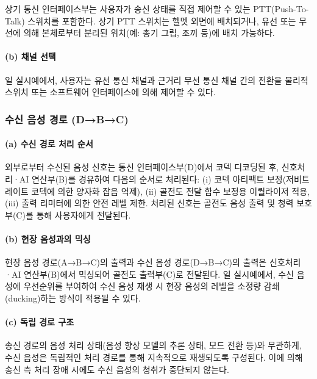 \documentclass{article}
\begin{document}
상기 통신 인터페이스부는 사용자가 송신 상태를 직접 제어할 수 있는 PTT(Push-To-Talk) 스위치를 포함한다. 상기 PTT 스위치는 헬멧 외면에 배치되거나, 유선 또는 무선에 의해 본체로부터 분리된 위치(예: 총기 그립, 조끼 등)에 배치 가능하다.

\paragraph{(b) 채널 선택}

일 실시예에서, 사용자는 유선 통신 채널과 근거리 무선 통신 채널 간의 전환을 물리적 스위치 또는 소프트웨어 인터페이스에 의해 제어할 수 있다.

\subsubsection{수신 음성 경로 (D→B→C)}

\paragraph{(a) 수신 경로 처리 순서}

외부로부터 수신된 음성 신호는 통신 인터페이스부(D)에서 코덱 디코딩된 후, 신호처리·AI 연산부(B)를 경유하여 다음의 순서로 처리된다: (i) 코덱 아티팩트 보정(저비트레이트 코덱에 의한 양자화 잡음 억제), (ii) 골전도 전달 함수 보정용 이퀄라이저 적용, (iii) 출력 리미터에 의한 안전 레벨 제한. 처리된 신호는 골전도 음성 출력 및 청력 보호부(C)를 통해 사용자에게 전달된다.

\paragraph{(b) 현장 음성과의 믹싱}

현장 음성 경로(A→B→C)의 출력과 수신 음성 경로(D→B→C)의 출력은 신호처리·AI 연산부(B)에서 믹싱되어 골전도 출력부(C)로 전달된다. 일 실시예에서, 수신 음성에 우선순위를 부여하여 수신 음성 재생 시 현장 음성의 레벨을 소정량 감쇄(ducking)하는 방식이 적용될 수 있다.

\paragraph{(c) 독립 경로 구조}

송신 경로의 음성 처리 상태(음성 향상 모델의 추론 상태, 모드 전환 등)와 무관하게, 수신 음성은 독립적인 처리 경로를 통해 지속적으로 재생되도록 구성된다. 이에 의해 송신 측 처리 장애 시에도 수신 음성의 청취가 중단되지 않는다.
\end{document}
